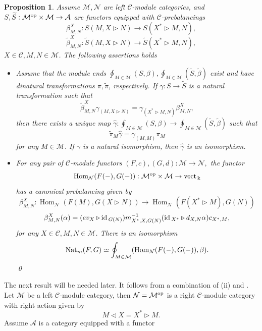 \documentclass[11pt]{amsart}
\newcommand{\Mo}{{\mathcal M}}
\newcommand{\No}{{\mathcal N}}
\newcommand{\ca}{{\mathcal C}}
\newcommand{\op}{\rm{op}}
\newcommand{\Ac}{{\mathcal A}}
\newcommand{\ku}{{\Bbbk}}
\newcommand{\id}{\mbox{\rm id\,}}
\newcommand{\vect}{\mbox{\rm vect\,}}
\newcommand{\Nat}{\mbox{\rm Nat\,}}
\newcommand\Hom{\operatorname{Hom}}
\renewcommand{\_}[1]{\mbox{$_{\left( #1 \right)}$}}
\theoremstyle{plain}
\numberwithin{equation}{section}
\newtheorem{prop}[teo]{Proposition}
\theoremstyle{definition}
\theoremstyle{remark}
\theoremstyle{introTheorems}
\begin{document}
\begin{prop}\label{compilat-r} Assume  $\Mo, \No$ are  left $\ca$-module categories, and $S, \widetilde{S}:\Mo^{\op}\times \Mo\to \Ac$ are functors equipped with $\ca$-prebalancings $$\beta^X_{M,N}: S(M,X\triangleright N)\to S(X^*\triangleright M,N),$$ $$ \widetilde{\beta}^X_{M,N}: \widetilde{S}(M,X\triangleright N)\to \widetilde{S}(X^*\triangleright M,N),$$ $X\in \ca, M,N\in \Mo$. The following assertions holds
\begin{itemize}

\item[(i)] Assume that the module ends $\oint_{M\in \Mo} (S,\beta), \oint_{M\in \Mo} (\widetilde{S},\widetilde{\beta})$ exist and have dinatural transformations $\pi, \widetilde{\pi}$, respectively. If  $\gamma:S\to \widetilde{S}$ is a natural transformation  such that 
\begin{equation}\label{gamma-ind}
 \widetilde{\beta}^X_{M,N} \gamma_{(M,X\triangleright N)}=\gamma_{(X^*\triangleright M,N)} \beta^X_{M,N},
\end{equation}
then there exists a unique map $\widehat{\gamma}: \oint_{M\in \Mo} (S,\beta)\to \oint_{M\in \Mo} (\widetilde{S},\widetilde{\beta})$ such that   $$\widetilde{\pi}_M \widehat{\gamma}= \gamma_{(M,M)} \pi_M$$ for any $M\in \Mo$. If $\gamma$ is a natural isomorphism, then  $\widehat{\gamma}$ is an isomorphism.


\item[(ii)] For any pair of $\ca$-module functors $(F, c), (G, d):\Mo\to \No,$ the functor $$\Hom_{\No}(F(-), G(-)): \Mo^{\op}\times \Mo\to \vect_\ku$$
has a canonical prebalancing  given by
\begin{equation}\label{beta-for-hom}
 \beta^X_{M,N}: \Hom_{\No}(F(M), G(X\triangleright N))\to \Hom_{\No}(F(X^*\triangleright M), G(N))
\end{equation}
$$ \beta^X_{M,N}(\alpha)= (ev_X\triangleright \id_{G(N)}) m^{-1}_{X^*,X,G(N)} (\id_{X^*}\triangleright d_{X,N}\alpha)c_{X^*,M},$$
for any $X\in \ca, M, N\in \Mo$.
There is an isomorphism $$ \Nat_{\!m}(F,G)\simeq \oint_{M\in \Mo} (\Hom_{\No}(F(-), G(-)), \beta).$$\qed
\end{itemize}
\end{prop}
The next result will be needed later. It follows from a combination of \cite[Prop. 3.3]{BM} (ii) and \cite[Lemma 3.6]{BM}.
Let $\Mo$ be a left $\ca$-module category, then $\No=\Mo^{\op}$ is a right $\ca$-module category with right action given by
$$M \triangleleft X= X^*\triangleright M.  $$
 Assume $\Ac$ is a category equipped with a functor
\end{document}
